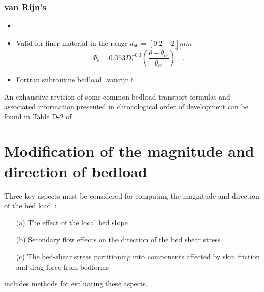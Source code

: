 \subsubsection{van Rijn's}
\begin{itemize}
\item {}
\item Valid for finer material in the range $d_{50} = [0.2-2]mm$
\begin{equation*}
\Phi_b = 0.053 D_*^{-0.3} \left( \frac{\theta-\theta_{cr}}{\theta_{cr}} \right)^{2.1}.
\end{equation*}

\item Fortran subroutine {\ttfamily bedload\_vanrijn.f}.
\end{itemize}

\noindent
An exhaustive revision of some common bedload transport formulas and associated information presented in chronological order of development can be found in Table D-2 of~\cite{GarciaBook2006}.

\section{Modification of the magnitude and direction of bedload}
Three key aspects must be considered for computing the magnitude and direction of the bed load~\cite{Abad08}:
\begin{itemize}
\item[(a)] The effect of the local bed slope
\item[(b)] Secondary flow effects on the direction of the bed shear stress
\item[(c)] The bed-shear stress partitioning into components affected by skin friction and drag force from bedforms
\end{itemize}
\noindent
\sisyphe{} includes methods for evaluating these aspects.


